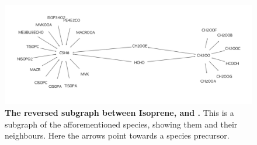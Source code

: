 \begin{figure}[H]
  \centering
  \includegraphics[width=\textwidth]{figures_c3/prtest0.png}

  \label{fig:prtest0}

\caption{\textbf{The reversed subgraph between Isoprene,  and .} This is a subgraph of the afforementioned species, showing them and their neighbours. Here the arrows point towards a species precursor. }
\end{figure}

